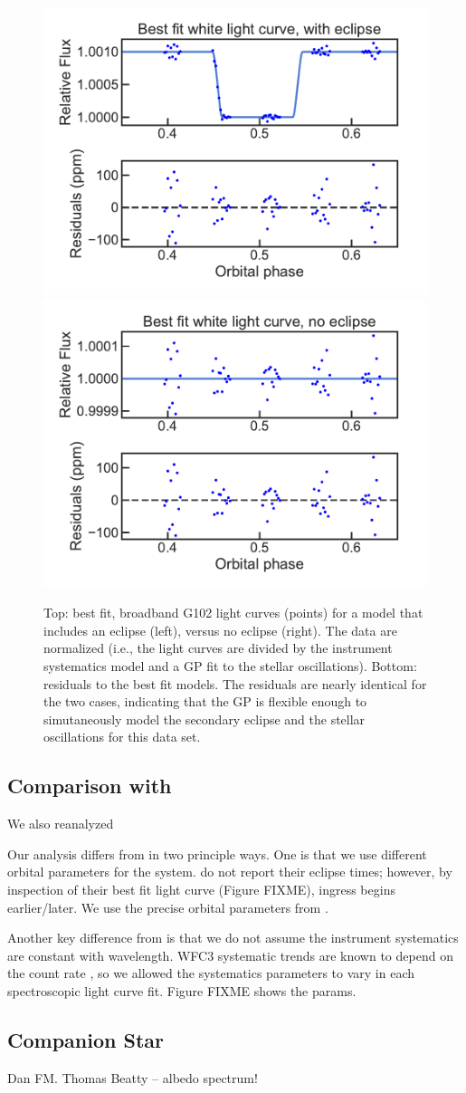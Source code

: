 \documentclass[twocolumn]{aastex62}
\begin{document}
\begin{figure}
\includegraphics[width = 0.5 \textwidth]{figures/eclipse.pdf}
\includegraphics[width = 0.5 \textwidth]{figures/no_eclipse.pdf}
\caption{Top: best fit, broadband G102 light curves (points) for a model that includes an eclipse (left), versus no eclipse (right). The data are normalized (i.e., the light curves are divided by the instrument systematics model and a GP fit to the stellar oscillations). Bottom: residuals to the best fit models. The residuals are nearly identical for the two cases, indicating that the GP is flexible enough to simutaneously model the secondary eclipse and the stellar oscillations for this data set.} 
\label{fig:GP}
\end{figure}

\subsection{Comparison with \cite{haynes15}}
We also reanalyzed 

Our analysis differs from \cite{haynes15} in two principle ways. One is that we use different orbital parameters for the system. \cite{haynes15} do not report their eclipse times; however, by inspection of their best fit light curve (Figure FIXME), ingress begins earlier/later. We use the precise orbital parameters from \cite{zhang17}.

Another key difference from \cite{haynes15} is that we do not assume the instrument systematics are constant with wavelength. WFC3 systematic trends are known to depend on the count rate \cite{zhou17}, so we allowed the systematics parameters to vary in each spectroscopic light curve fit.  Figure FIXME shows the params.


\subsection{Companion Star}

\acknowledgments
Dan FM. Thomas Beatty -- albedo spectrum!



\end{document}
